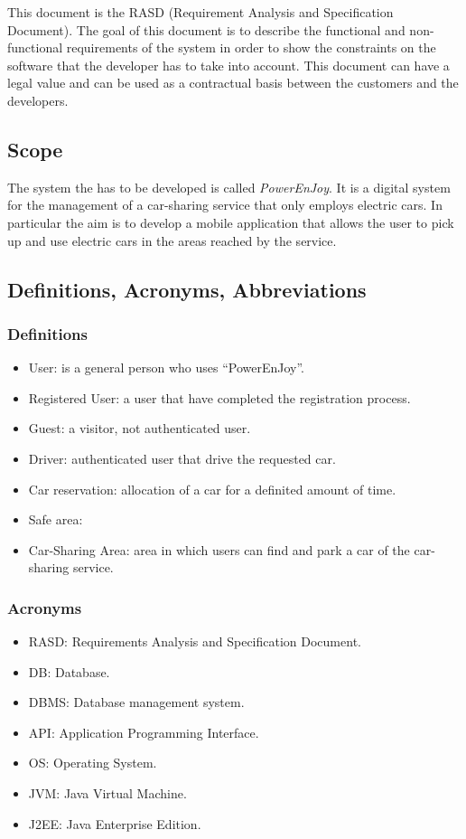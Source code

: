 \documentclass[english]{article}
\newcounter{requirement}
\begin{document}
This document is the RASD (Requirement Analysis and Specification Document). The goal of this document is to describe the functional and non-functional requirements of the system in order to show the constraints on the software that the developer has to take into account. This document can have a legal value and can be used as a contractual basis between the customers and the developers.

\subsection{Scope}
The system the has to be developed is called \emph{PowerEnJoy}. It is a digital system for the management of a car-sharing service that only employs electric cars. In particular the aim is to develop a mobile application that allows the user to pick up and use electric cars in the areas reached by the service. 

\subsection{Definitions, Acronyms, Abbreviations}


\subsubsection{Definitions}
\begin{itemize}
	\item User: is a general person who uses ``PowerEnJoy''.
	\item Registered User: a user that have completed the registration process.
	\item Guest: a visitor, not authenticated user.
	\item Driver: authenticated user that drive the requested car.
	\item Car reservation: allocation of a car for a definited amount of time.
	\item Safe area: 
	\item Car-Sharing Area: area in which users can find and park a car of the car-sharing service.
	
\end{itemize}

\subsubsection{Acronyms}
\begin{itemize}
	\item RASD: Requirements Analysis and Specification Document.
	\item DB: Database.
	\item DBMS: Database management system.
	\item API: Application Programming Interface.
	\item OS: Operating System.
	\item JVM: Java Virtual Machine.
	\item J2EE: Java Enterprise Edition.
\end{itemize}
\end{document}
